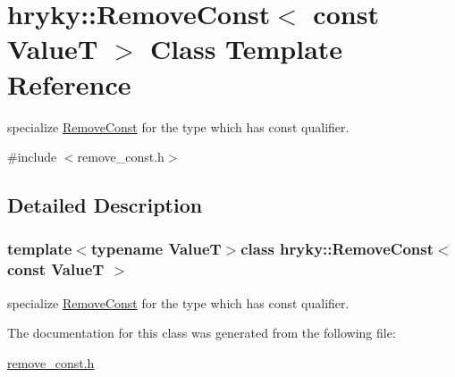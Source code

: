 \hypertarget{classhryky_1_1_remove_const_3_01const_01_value_t_01_4}{\section{hryky\-:\-:Remove\-Const$<$ const Value\-T $>$ Class Template Reference}
\label{classhryky_1_1_remove_const_3_01const_01_value_t_01_4}
}


specialize \hyperlink{classhryky_1_1_remove_const}{Remove\-Const} for the type which has const qualifier.  




{\ttfamily \#include $<$remove\-\_\-const.\-h$>$}



\subsection{Detailed Description}
\subsubsection*{template$<$typename Value\-T$>$class hryky\-::\-Remove\-Const$<$ const Value\-T $>$}

specialize \hyperlink{classhryky_1_1_remove_const}{Remove\-Const} for the type which has const qualifier. 

The documentation for this class was generated from the following file\-:\begin{DoxyCompactItemize}
\item 
\hyperlink{remove__const_8h}{remove\-\_\-const.\-h}\end{DoxyCompactItemize}
